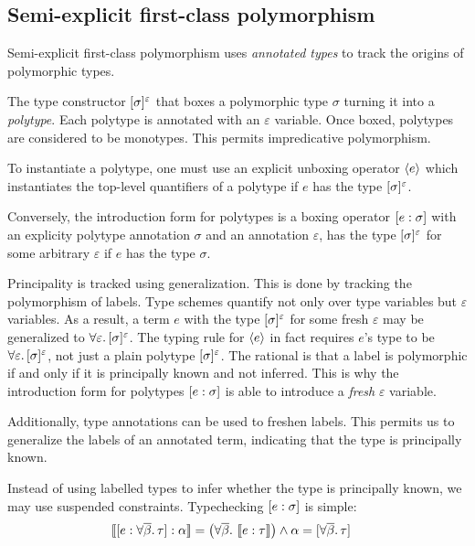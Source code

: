 \documentclass[acmsmall,screen,nonacm]{acmart}
\begin{document}
\subsection{Semi-explicit first-class polymorphism}


Semi-explicit first-class polymorphism \citep{TODO} uses \textit{annotated
types} to track the origins of polymorphic types.

The type constructor $[\sigma]^{\varepsilon}$ that boxes a polymorphic
type $\sigma$ turning it into a \textit{polytype}. Each polytype is annotated
with an $\varepsilon$ variable.  Once boxed, polytypes are considered to be
monotypes. This permits impredicative polymorphism.

To instantiate a polytype, one must use an explicit unboxing operator
$\langle e \rangle$ which instantiates the top-level quantifiers of a polytype if $e$
has the type $[\sigma]^{\varepsilon}$.

Conversely, the introduction form for polytypes is a boxing operator $[ e : \sigma ]$ with an explicity polytype annotation $\sigma$ and an annotation
$\varepsilon$, has the type $[\sigma]^{\varepsilon}$ for some arbitrary 
$\varepsilon$ if $e$ has the type $\sigma$.

Principality is tracked using generalization.  This is done by tracking the
polymorphism of labels. Type schemes quantify not only over type variables
but $\varepsilon$ variables. As a result, a term $e$ with the type $[\sigma]^{\varepsilon}$ for some fresh $\varepsilon$ may be generalized to
$\forall {\varepsilon}.\,{[\sigma]^{\varepsilon}}$.  The typing rule for
$\langle e \rangle$ in fact requires $e$'s type to be $\forall {\varepsilon}.\,{[\sigma]^{\varepsilon}}$, not just a plain polytype $[\sigma]^{\varepsilon}$. The rational is that a label is polymorphic if and only if it
is principally known and not inferred.  This is why the introduction form
for polytypes $[ e : \sigma ]$ is able to introduce a \textit{fresh}
$\varepsilon$ variable.

Additionally, type annotations can be used to freshen labels.  This permits
us to generalize the labels of an annotated term, indicating that the type
is principally known.


Instead of using labelled types to infer whether the type is principally
known, we may use suspended constraints.  Typechecking $[ e : \sigma ]$ is
simple:
\begin{align*}
  \llbracket [ e : \forall {\overline{\beta}}.\,{\tau} ] : \alpha \rrbracket &= \left(\forall {\overline{\beta}}. ~ \llbracket e : \tau \rrbracket \right) \wedge \alpha = [\forall {\overline{\beta}}.\,{\tau}]
\end{align*}
\end{document}
